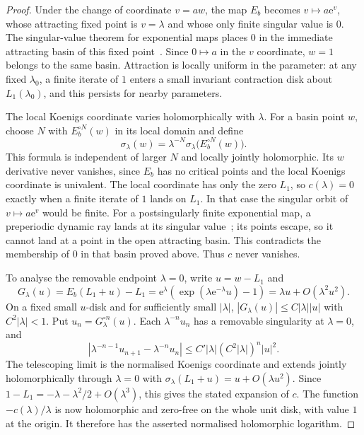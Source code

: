 \documentclass[11pt,a4paper]{article}
\theoremstyle{definition}
\newcommand{\eee}{\mathrm{e}}
\begin{document}
\begin{proof}
Under the change of coordinate $v=aw$, the map $E_b$ becomes
$v\mapsto a\eee^v$, whose attracting fixed point is $v=\lambda$ and
whose only finite singular value is $0$.  The singular-value theorem
for exponential maps places $0$ in the immediate attracting basin
of this fixed point~\cite[\S2]{Schleicher2003}.  Since $0\mapsto a$
in the $v$ coordinate, $w=1$ belongs to the same basin.
Attraction is locally uniform in the parameter: at any fixed
$\lambda_0$, a finite iterate of $1$ enters a small invariant
contraction disk about $L_1(\lambda_0)$, and this persists for nearby
parameters.

The local Koenigs coordinate varies holomorphically with $\lambda$.
For a basin point $w$, choose $N$ with $E_b^{\circ N}(w)$ in its local
domain and define
\[
 \sigma_\lambda(w)=\lambda^{-N}
       \sigma_\lambda\bigl(E_b^{\circ N}(w)\bigr).
\]
This formula is independent of larger $N$ and locally jointly
holomorphic.  Its $w$ derivative never vanishes, since $E_b$ has no
critical points and the local Koenigs coordinate is univalent.
The local coordinate has only the zero $L_1$, so $c(\lambda)=0$
exactly when a finite iterate of $1$ lands on $L_1$.  In that case
the singular orbit of $v\mapsto a\eee^v$ would be finite.
For a postsingularly finite exponential map, a preperiodic dynamic
ray lands at its singular value~\cite[Thm.~3.1]{LaubnerSchleicherVicol2008};
its points escape, so it cannot land at a point in the open attracting
basin.  This contradicts the membership of $0$ in that basin proved above.
Thus $c$ never vanishes.

To analyse the removable endpoint $\lambda=0$, write $u=w-L_1$ and
\[
 G_\lambda(u)=E_b(L_1+u)-L_1
   =\eee^\lambda(\exp(\lambda\eee^{-\lambda}u)-1)
   =\lambda u+O(\lambda^2u^2).
\]
On a fixed small $u$-disk and for sufficiently small $|\lambda|$,
$|G_\lambda(u)|\le C|\lambda||u|$ with $C^2|\lambda|<1$.
Put $u_n=G_\lambda^{\circ n}(u)$.  Each
$\lambda^{-n}u_n$ has a removable singularity at $\lambda=0$, and
\[
 \left|\lambda^{-n-1}u_{n+1}-\lambda^{-n}u_n\right|
 \le C'|\lambda|(C^2|\lambda|)^n|u|^2.
\]
The telescoping limit is the normalised Koenigs coordinate and extends
jointly holomorphically through $\lambda=0$ with
$\sigma_\lambda(L_1+u)=u+O(\lambda u^2)$.
Since $1-L_1=-\lambda-\lambda^2/2+O(\lambda^3)$, this gives the
stated expansion of $c$.  The function $-c(\lambda)/\lambda$ is now
holomorphic and zero-free on the whole unit disk, with value $1$ at the
origin.  It therefore has the asserted normalised holomorphic logarithm.


\end{proof}
\end{document}
